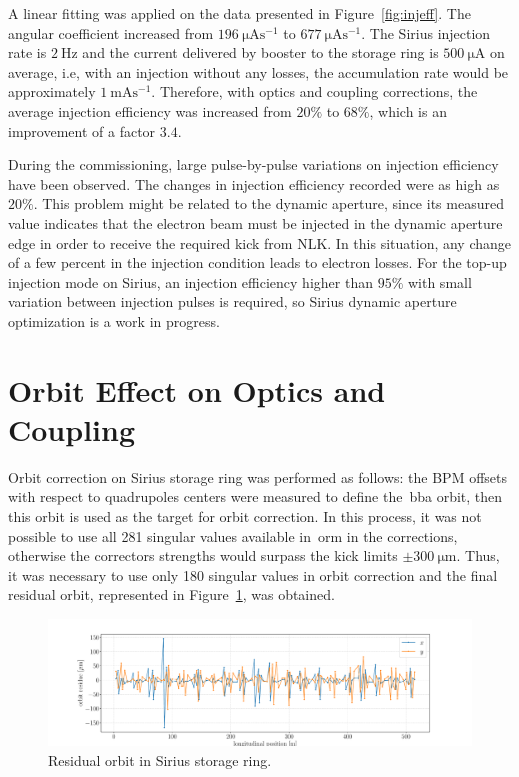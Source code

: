 A linear fitting was applied on the data presented in Figure~\ref{fig:injeff}. The angular coefficient increased from $\SI{196}{\micro\ampere\second^{-1}}$ to $\SI{677}{\micro\ampere\second^{-1}}$. The Sirius injection rate is $\SI{2}{\hertz}$ and the current delivered by booster to the storage ring is $\SI{500}{\micro\ampere}$ on average, i.e, with an injection without any losses, the accumulation rate would be approximately $\SI{1}{\milli\ampere\second^{-1}}$. Therefore, with optics and coupling corrections, the average injection efficiency was increased from $20\%$ to $68\%$, which is an improvement of a factor $3.4$.

During the commissioning, large pulse-by-pulse variations on injection efficiency have been observed. The changes in injection efficiency recorded were as high as $20\%$. This problem might be related to the dynamic aperture, since its measured value indicates that the electron beam must be injected in the dynamic aperture edge in order to receive the required kick from NLK. In this situation, any change of a few percent in the injection condition leads to electron losses. For the top-up injection mode on Sirius, an injection efficiency higher than $95\%$ with small variation between injection pulses is required, so Sirius dynamic aperture optimization is a work in progress. 

\section{Orbit Effect on Optics and Coupling}\label{sec:orbit_effect}
Orbit correction on Sirius storage ring was performed as follows: the BPM offsets with respect to quadrupoles centers were measured to define the~\gls{bba} orbit, then this orbit is used as the target for orbit correction. In this process, it was not possible to use all 281 singular values available in~\gls{orm} in the corrections, otherwise the correctors strengths would surpass the kick limits $\pm \SI{300}{\micro\meter}$. Thus, it was necessary to use only 180 singular values in orbit correction and the final residual orbit, represented in Figure~\ref{fig:orbit_residue}, was obtained.
\begin{figure}[h!]
\centering
\includegraphics[width=1.0\textwidth]{figures/orbit_residue.pdf}
\caption{Residual orbit in Sirius storage ring.}
\label{fig:orbit_residue}
\end{figure}

